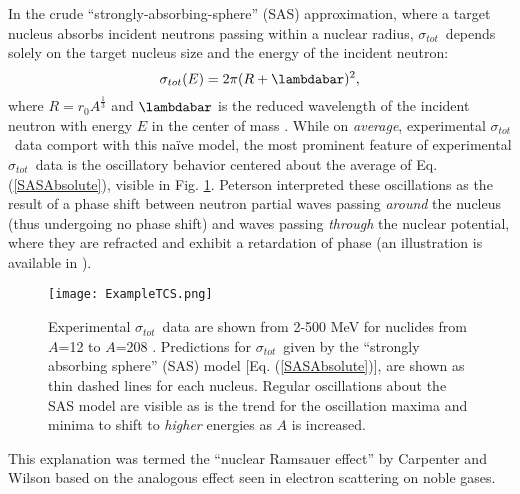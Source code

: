 \documentclass[twocolumn,secnumarabic,amssymb, nobibnotes, aps, prl,
superscriptaddress, nobalancelastpage, floatfix]{revtex4}
\newcommand{\tot}{\ensuremath{\sigma_{tot}}}
\newcommand{\totRD}{\ensuremath{\sigma_{A,A'}}(E)}
\begin{document}
In the crude ``strongly-absorbing-sphere'' (SAS) approximation, where a target
nucleus absorbs incident neutrons passing within a nuclear radius,
\tot\ depends solely on the target nucleus size and the energy of the incident neutron:
\begin{equation} \label{SASAbsolute}
    \sigma_{tot}(E) = 2\pi(R + \lambdabar)^{2},
\end{equation}
where $R=r_{0}A^{\frac{1}{3}}$ and $\lambdabar$ is the reduced wavelength
of the incident neutron with energy $E$ in the center of mass \cite{Fernbach1949, Satchler1980}. 
While on \textit{average}, experimental \tot\ data comport with this na\"ive
model, the most prominent feature of experimental \tot\ data is the oscillatory
behavior centered about the average of Eq. (\ref{SASAbsolute}), visible in Fig.
\ref{SASphereVsExperiment}. Peterson \cite{Peterson1962} interpreted these oscillations as the 
result of a phase shift between neutron partial waves passing \textit{around} the 
nucleus (thus undergoing no phase shift) and waves passing
\textit{through} the nuclear potential, where they are refracted and exhibit a 
retardation of phase (an illustration is available in \cite{Satchler1980}).
\begin{figure}
    \texttt{[image: ExampleTCS.png]}
    \caption{
        Experimental \tot\ data are shown from 2-500
        MeV for nuclides from $A$=12 to $A$=208
        \protect\cite{Finlay1993, Schwartz1974, Poenitz1983, Abfalterer2000, Abfalterer2001}.
        Predictions for \tot\ given by the ``strongly absorbing sphere'' (SAS)
        model [Eq. (\ref{SASAbsolute})], are shown as thin dashed lines for each nucleus.
        Regular oscillations about the SAS model are visible
        as is the trend for the oscillation
        maxima and minima to shift to \textit{higher} energies as $A$ is increased.
    }
    \label{SASphereVsExperiment}
\end{figure}
This explanation was termed the 
``nuclear Ramsauer effect'' by Carpenter and Wilson \cite{Carpenter1959} based on 
the analogous effect seen in electron scattering on noble gases.
\end{document}
